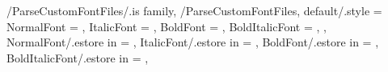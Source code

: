 \pgfkeys
{
  /ParseCustomFontFiles/.is family, /ParseCustomFontFiles,
  default/.style =
  {
    NormalFont = \empty,
    ItalicFont = \empty,
    BoldFont = \empty,
    BoldItalicFont = \empty,
  },
  NormalFont/.estore in = \TmpValueNormalFont,
  ItalicFont/.estore in = \TmpValueItalicFont,
  BoldFont/.estore in = \TmpValueBoldFont,
  BoldItalicFont/.estore in = \TmpValueBoldItalicFont,
} %

\newcommand{\SetCustomEngFontFiles}[1][\empty]
{%
  \SetFontUseType{\VarFontTypeCustom}
  \pgfkeys{/ParseCustomFontFiles, default, #1}%
  \ifthenelse{\equal{\TmpValueNormalFont}{\empty}}{}{%
    \renewcommand{\VarFontTypeCustomEngFileNameNormal}{%
        \TmpValueNormalFont}}%
  \ifthenelse{\equal{\TmpValueItalicFont}{\empty}}{}{%
    \renewcommand{\VarFontTypeCustomEngFileNameItalic}{%
        \TmpValueItalicFont}}%
  \ifthenelse{\equal{\TmpValueBoldFont}{\empty}}{}{%
    \renewcommand{\VarFontTypeCustomEngFileNameBold}{%
        \TmpValueBoldFont}}%
  \ifthenelse{\equal{\TmpValueBoldItalicFont}{\empty}}{}{%
    \renewcommand{\VarFontTypeCustomEngFileNameBoldItalic}{%
        \TmpValueBoldItalicFont}}%
} %

\newcommand{\SetCustomChiFontFiles}[1][\empty]
{%
  \SetFontUseType{\VarFontTypeCustom}
  \pgfkeys{/ParseCustomFontFiles, default, #1}%
  \ifthenelse{\equal{\TmpValueNormalFont}{\empty}}{}{%
    \renewcommand{\VarFontTypeCustomChiFileNameNormal}{%
        \TmpValueNormalFont}}%
  \ifthenelse{\equal{\TmpValueItalicFont}{\empty}}{}{%
    \renewcommand{\VarFontTypeCustomChiFileNameItalic}{%
        \TmpValueItalicFont}}%
  \ifthenelse{\equal{\TmpValueBoldFont}{\empty}}{}{%
    \renewcommand{\VarFontTypeCustomChiFileNameBold}{%
        \TmpValueBoldFont}}%
  \ifthenelse{\equal{\TmpValueBoldItalicFont}{\empty}}{}{%
    \renewcommand{\VarFontTypeCustomChiFileNameBoldItalic}{%
        \TmpValueBoldItalicFont}}%
} %

\newcommand{\VarFontTypeCustom}{10}


\def \VarFontDirPath {./template/fonts/} %
\def \GetFontDirPath {\VarFontDirPath}

\newcommand{\VarFontUseType}{\VarFontTypeTimesKaiu} %
\newcommand{\GetFontUseType}{\VarFontUseType}
\newcommand{\SetFontUseType}[1]
{%
  \renewcommand{\VarFontUseType}{#1}%
} %

